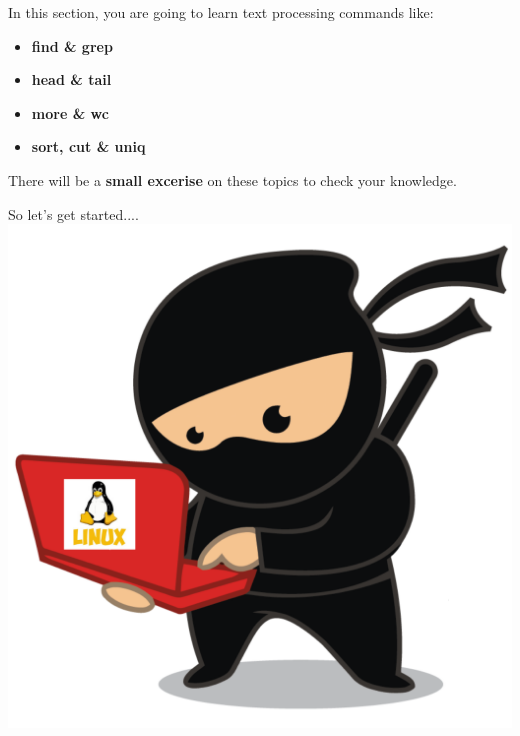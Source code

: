 \setlength{\columnsep}{3pt}
\begin{flushleft}
	\bigskip
	\bigskip
	\begin{tcolorbox}[breakable,notitle,boxrule=1pt,colback=black,colframe=black]
		\color{white}
		\bigskip
		In this section, you are going to learn text processing commands like:
		\begin{itemize}
			\item \textbf{find \& grep}
			\item \textbf{head \& tail}
			\item \textbf{more \& wc}
			\item \textbf{sort, cut \& uniq }
		\end{itemize}	
		\bigskip
		There will be a \textbf{small excerise} on these topics to check your knowledge.
		\bigskip
	\end{tcolorbox}
	
	
	\begin{multicols}{2}
		\vspace*{\fill}
		\vspace*{\fill}
		\vspace*{\fill}
		\vspace*{\fill}
		\vspace*{\fill}
		\vspace*{\fill}
		\vspace*{\fill}
		\vspace*{\fill}
		\vspace*{\fill}
		
		\vfill \null
		\columnbreak
		So let's get started....
		\includegraphics[scale=0.08]{content/linux_section.png}
	\end{multicols}	
	
\end{flushleft}

\newpage

